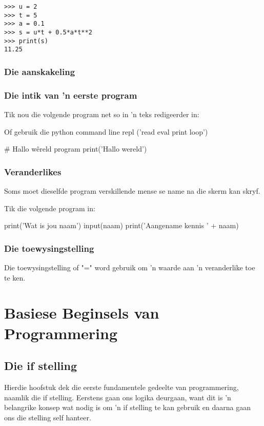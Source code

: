 \begin{lstlisting}[style=DOS]
>>> u = 2
>>> t = 5
>>> a = 0.1
>>> s = u*t + 0.5*a*t**2
>>> print(s)
11.25
\end{lstlisting}

\section{Die aanskakeling}

\section{Die intik van 'n eerste program}


Tik nou die volgende program net so in 'n teks redigeerder in:

Of gebruik die python command line repl ('read eval print loop')

\# Hallo w\^ereld program
print('Hallo wereld')


\section{Veranderlikes}

Soms moet dieselfde program verskillende mense se name na die skerm kan skryf.

Tik die volgende program in:

print('Wat is jou naam')
input(naam)
print('Aangename kennis ' + naam)

\section{Die toewysingstelling}

Die toewysingstelling of "=" word gebruik om 'n waarde aan 'n veranderlike toe te ken.



\part[Basiese Beginsels]
{Basiese Beginsels van\\ Programmering}

\chapter[Die if stelling]
{Die if stelling}

Hierdie hoofstuk dek die eerste fundamentele gedeelte van programmering, naamlik die if stelling.  Eerstens gaan ons logika deurgaan, want dit is 'n belangrike konsep wat nodig is om 'n if stelling te kan gebruik en daarna gaan ons die stelling self hanteer.

